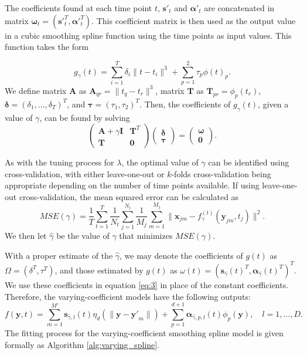 \documentclass[11pt,reqno]{article}
\theoremstyle{definition}
\begin{document}
The coefficients found at each time point $t$, $\mathbf{s'}_{t}$ and $\mathbf{\alpha'}_{t}$ are concatenated in matrix $\mathbf{\omega}_{t} = \left(\mathbf{s'}_{t}^T, \mathbf{\alpha'}_{t}^T\right)$. This coefficient matrix is then used as the output value in a cubic smoothing spline function using the time points as input values. This function takes the form

\[%
  g_{\gamma}(t) = \sum_{i=1}^{T}\delta_i\|t - t_i\|^{3} + \sum_{p=1}^{2}\tau_p \phi(t)_p
.\]%
We define matrix $\mathbf{A}$ as $\mathbf{A}_{qr} = \|t_q - t_r\|^{3}$, matrix $\mathbf{T}$ as $\mathbf{T}_{pr} = \phi_p(t_r)$, $\mathbf{\delta} = \left(\delta_1, \dots, \delta_T\right)^{T}$, and $\mathbf{\tau} = \left(\tau_1, \tau_2\right)^{T}$. Then, the coefficients of $g_{\gamma}(t)$, given a value of $\gamma$, can be found by solving
\begin{equation}
  \left(
  \begin{array}{cc}
    \mathbf{A} + \gamma\mathbf{I} & \mathbf{T}^{T} \\
    \mathbf{T} & \mathbf{0}
  \end{array}
  \right)\left(
  \begin{array}{c}
    \mathbf{\delta} \\
    \mathbf{\tau}
  \end{array}
  \right) = \left(
  \begin{array}{c}
    \mathbf{\omega} \\
    \mathbf{0}
  \end{array}
  \right). \label{eq:7}
\end{equation}

As with the tuning process for $\lambda$, the optimal value of $\gamma$ can be identified using cross-validation, with either leave-one-out or $k$-folds cross-validation being appropriate depending on the number of time points available. If using leave-one-out cross-validation, the mean squared error can be calculated as
\begin{equation}
  MSE(\gamma) = \frac{1}{T}\sum_{t=1}^{T}\frac{1}{N_t}\sum_{j=1}^{N_t}\frac{1}{M_j}\sum_{m=1}^{M_j}\|\mathbf{x}_{jm} - f_{\gamma}^{(t)}(\mathbf{y}_{jm}, t_j)\|^2. \label{eq:8}
\end{equation}
We then let $\hat{\gamma}$ be the value of $\gamma$ that minimizes $MSE(\gamma)$.

With a proper estimate of the $\hat{\gamma}$, we may denote the coefficients of $g(t)$ as $\Omega = \left(\delta^{T}, \tau^{T}\right)$, and those estimated by $g(t)$ as $\omega(t) = \left(\mathbf{s}_{\hat{\gamma}}(t)^{T}, \mathbf{\alpha}_{\hat{\gamma}}(t)^{T}\right)^{T}$. We use these coefficients in equation \ref{eq:3} in place of the constant coefficients. Therefore, the varying-coefficient models have the following outputs:
\begin{equation}
  f(\mathbf{y}, t) = \sum_{m=1}^{M'}\mathbf{s}_{\hat{\gamma}, l}(t) \eta_{d}\left(\|\mathbf{y} - \mathbf{y'}_m\|\right) + \sum_{p=1}^{d + 1}\mathbf{\alpha}_{\hat{\gamma}, p, l}(t) \phi_p(\mathbf{y}), \quad l = 1, \dots, D. \label{eq:9}
\end{equation}
The fitting process for the varying-coefficient smoothing spline model is given formally as Algorithm \ref{alg:varying_spline}.
\end{document}
